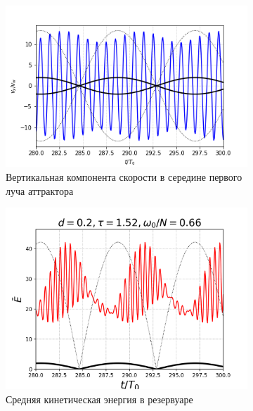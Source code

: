 \begin{figure}
\begin{subfigure}[с]{0.45\textwidth}
        \includegraphics[width=1\textwidth]{pics/H40L60N1ap02dp20w1p58w2p66Biharm/vyX36p49Y7p94frm280to300.png}
        \caption{Вертикальная компонента скорости в середине первого луча аттрактора}
    \end{subfigure}
    \begin{subfigure}[с]{0.45\textwidth}
        \includegraphics[width=1\textwidth]{pics/H40L60N1ap02dp20w1p58w2p66Biharm/2D36x36DiagramH40L60N1ap02dp20w1p58w2p66BiharmtotKEnonDim.png}
        \caption{Средняя кинетическая энергия в резервуаре}
    \end{subfigure}
    \par
    \begin{subfigure}[с]{0.45\textwidth}

\end{subfigure}
\end{figure}
